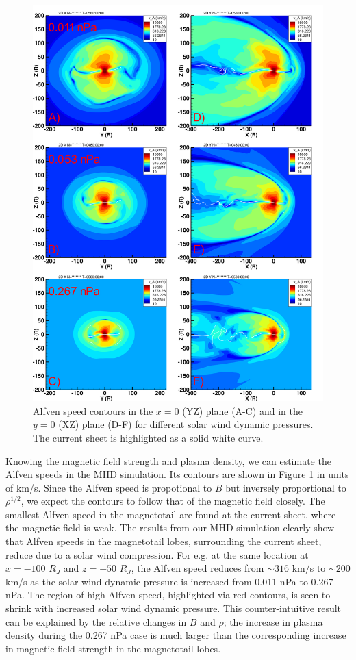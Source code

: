 \begin{figure}
    \centering
    \includegraphics[height=0.9\textheight]{images5/compare_runs_currentsheet_AlfvenSpeed.png}
    \caption{Alfven speed contours in the $x=0$ (YZ) plane (A-C) and in the $y=0$ (XZ) plane (D-F) for different solar wind dynamic pressures. The current sheet is highlighted as a solid white curve.}
    \label{fig:chp5-comparison-slices-alfven}
\end{figure}

Knowing the magnetic field strength and plasma density, we can estimate the Alfven speeds in the MHD simulation. Its contours are shown in Figure \ref{fig:chp5-comparison-slices-alfven} in units of km/s. Since the Alfven speed is propotional to $B$ but inversely proportional to $\rho^{1/2}$, we expect the contours to follow that of the magnetic field closely. The smallest Alfven speed in the magnetotail are found at the current sheet, where the magnetic field is weak. The results from our MHD simulation clearly show that Alfven speeds in the magnetotail lobes, surrounding the current sheet, reduce due to a solar wind compression. For e.g. at the same location at $x=-100$ $R_J$ and $z=-50$ $R_J$, the Alfven speed reduces from $\sim316$ km/s to $\sim200$ km/s as the solar wind dynamic pressure is increased from 0.011 nPa to 0.267 nPa. The region of high Alfven speed, highlighted via red contours, is seen to shrink with increased solar wind dynamic pressure. This counter-intuitive result can be explained by the relative changes in $B$ and $\rho$; the increase in plasma density during the 0.267 nPa case is much larger than the corresponding increase in magnetic field strength in the magnetotail lobes. 

